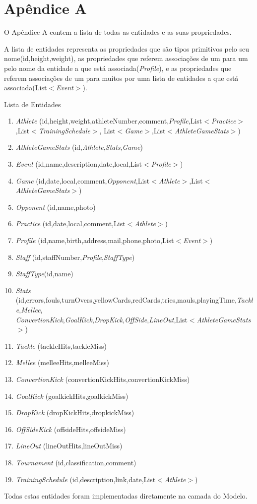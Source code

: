 %
%
%
\chapter{Apêndice A} \label{ap:exemplo}
O Apêndice A contem a lista de todas as entidades e as suas propriedades. 

A lista de entidades representa as propriedades que são tipos primitivos pelo seu nome(id,height,weight), as propriedades que referem associações de um para um pelo nome da entidade a que está associada(\emph{Profile}), e as propriedades que referem associações de um para muitos por uma lista de entidades a que está associada(List$<$\emph{Event}$>$).


Lista de Entidades
\begin{enumerate}
	\item \emph{Athlete}	(id,height,weight,athleteNumber,comment,\emph{Profile},List$<$\emph{Practice}$>$,List$<$\emph{TrainingSchedule}$>$,
	List$<$\emph{Game}$>$,List$<$\emph{AthleteGameStats}$>$)
	\item \emph{AthleteGameStats} (id,\emph{Athlete},\emph{Stats},\emph{Game})
	\item \emph{Event} (id,name,description,date,local,List$<$\emph{Profile}$>$)
	\item \emph{Game} (id,date,local,comment,\emph{Opponent},List$<$\emph{Athlete}$>$,List$<$\emph{AthleteGameStats}$>$)
	\item \emph{Opponent}
	(id,name,photo)
	\item \emph{Practice} (id,date,local,comment,List$<$\emph{Athlete}$>$)
	\item \emph{Profile} (id,name,birth,address,mail,phone,photo,List$<$\emph{Event}$>$)
	\item \emph{Staff} (id,staffNumber,\emph{Profile},\emph{StaffType})
	\item \emph{StaffType}(id,name)
	\item \emph{Stats} (id,errors,fouls,turnOvers,yellowCards,redCards,tries,mauls,playingTime,\emph{Tackle},\emph{Mellee},\\
	\emph{ConvertionKick},\emph{GoalKick},\emph{DropKick},\emph{OffSide},\emph{LineOut},List$<$\emph{AthleteGameStats}$>$)
	\item \emph{Tackle} (tackleHits,tackleMiss)
	\item \emph{Mellee} (melleeHits,melleeMiss)
	\item \emph{ConvertionKick} (convertionKickHits,convertionKickMiss)
	\item \emph{GoalKick} (goalkickHits,goalkickMiss)
	\item \emph{DropKick} (dropKickHits,dropkickMiss)
	\item \emph{OffSideKick} (offsideHits,offsideMiss)
	\item \emph{LineOut} (lineOutHits,lineOutMiss)
	\item \emph{Tournament} (id,classification,comment)
	\item \emph{TrainingSchedule} (id,description,link,date,List$<$\emph{Athlete}$>$)
\end{enumerate}
Todas estas entidades foram implementadas diretamente na camada do Modelo.
\newpage